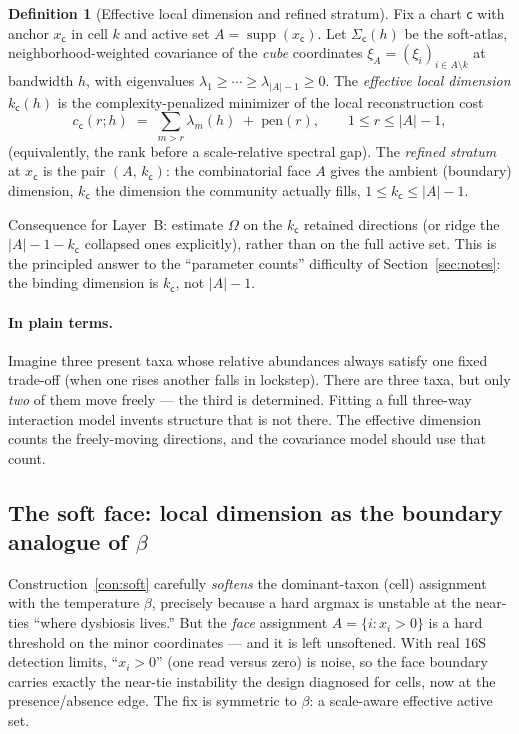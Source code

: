 \documentclass[11pt]{article}
\theoremstyle{definition}
\newtheorem{definition}{Definition}[section]
\theoremstyle{plain}
\theoremstyle{remark}
\newcommand{\supp}{\operatorname{supp}}
\newcommand{\1}{\mathbf{1}}
\newcommand{\Prec}{\Omega}
\newcommand{\cc}{\mathsf{c}}              %
\newcommand{\abs}[1]{\lvert #1 \rvert}
\begin{document}
\begin{definition}[Effective local dimension and refined stratum]\label{def:effdim}
Fix a chart $\cc$ with anchor $x_\cc$ in cell $k$ and active set $A=\supp(x_\cc)$.
Let $\Sigma_\cc(h)$ be the soft-atlas, neighborhood-weighted covariance of the
\emph{cube} coordinates $\xi_{A}=(\xi_i)_{i\in A\setminus k}$ at bandwidth $h$,
with eigenvalues $\lambda_1\ge\cdots\ge\lambda_{\abs{A}-1}\ge0$. The
\emph{effective local dimension} $k_\cc(h)$ is the complexity-penalized minimizer
of the local reconstruction cost
\[
  c_\cc(r;h)\;=\;\sum_{m>r}\lambda_m(h)\;+\;\mathrm{pen}(r),
  \qquad 1\le r\le \abs{A}-1,
\]
(equivalently, the rank before a scale-relative spectral gap). The \emph{refined
stratum} at $x_\cc$ is the pair $(A,\,k_\cc)$: the combinatorial face $A$ gives
the ambient (boundary) dimension, $k_\cc$ the dimension the community actually
fills, $1\le k_\cc\le\abs{A}-1$.
\end{definition}

Consequence for Layer~B: estimate $\Prec$ on the $k_\cc$ retained directions (or
ridge the $\abs{A}-1-k_\cc$ collapsed ones explicitly), rather than on the full
active set. This is the principled answer to the ``parameter counts'' difficulty
of Section~\ref{sec:notes}: the binding dimension is $k_\cc$, not $\abs{A}-1$.

\paragraph{In plain terms.}
Imagine three present taxa whose relative abundances always satisfy one fixed
trade-off (when one rises another falls in lockstep). There are three taxa, but
only \emph{two} of them move freely --- the third is determined. Fitting a full
three-way interaction model invents structure that is not there. The effective
dimension counts the freely-moving directions, and the covariance model should
use that count.

\subsection{The soft face: local dimension as the boundary analogue of $\beta$}
\label{sec:softface}

Construction~\ref{con:soft} carefully \emph{softens} the dominant-taxon (cell)
assignment with the temperature $\beta$, precisely because a hard argmax is
unstable at the near-ties ``where dysbiosis lives.'' But the \emph{face}
assignment $A=\{i:x_i>0\}$ is a hard threshold on the minor coordinates --- and
it is left unsoftened. With real 16S detection limits, ``$x_i>0$'' (one read
versus zero) is noise, so the face boundary carries exactly the near-tie
instability the design diagnosed for cells, now at the presence/absence edge. The
fix is symmetric to $\beta$: a scale-aware effective active set.
\end{document}
